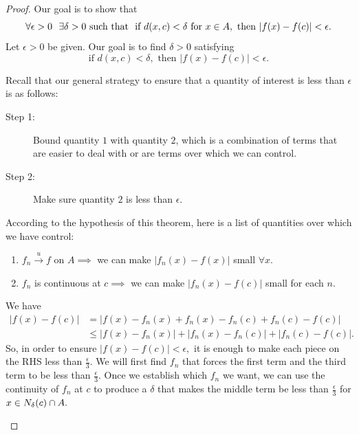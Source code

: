 \begin{proof}
    Our goal is to show that 
    $$\forall \epsilon > 0 ~~\exists \delta > 0 \text{ such that } \text{ if } d(x,c) < \delta \text{ for } x \in A, \text{ then } |f(x) - f(c)| < \epsilon.$$
    Let $\epsilon > 0$ be given. Our goal is to find $\delta > 0$ satisfying 
    $$\text{if } d(x,c) < \delta, \text{ then } |f(x) - f(c)| < \epsilon.$$

    \begin{info}
        Recall that our general strategy to ensure that a quantity of interest is less than $\epsilon$ is as follows:
        \begin{description}
            \item[Step 1: ] Bound quantity $1$ with quantity $2$, which is a combination of terms that are easier to deal with or are terms over which we can control.
            \item[Step 2: ] Make sure quantity $2$ is less than $\epsilon.$  
        \end{description}
        According to the hypothesis of this theorem, here is a list of quantities over which we have control:
        \begin{enumerate}
            \item $f_n \overset{u}{\to}f$ on $A \implies$ we can make $|f_n(x) - f(x)|$ small $\forall x.$
            \item $f_n$ is continuous at $c \implies$ we can make $|f_n(x) - f(c)|$ small for each $n$. 
        \end{enumerate}
        We have
        \begin{align*}
            |f(x) - f(c)| &= |f(x) - f_n(x) + f_n(x) - f_n(c) + f_n(c) - f(c)| \\
            &\leq |f(x) - f_n(x)| + |f_n(x) - f_n(c)| + |f_n(c) - f(c)|.
        \end{align*}
        So, in order to ensure $|f(x) - f(c)| < \epsilon,$ it is enough to make each piece on the RHS less than $\frac{\epsilon}{3}.$ We will first find $f_n$ that forces the first term and the third term to be less than $\frac{\epsilon}{3}.$ Once we establish which $f_n$ we want, we can use the continuity of $f_n$ at $c$ to produce a $\delta$ that makes the middle term be less than $\frac{\epsilon}{3}$ for $x \in N_{\delta}(c) \cap A.$
    \end{info}


\end{proof}
